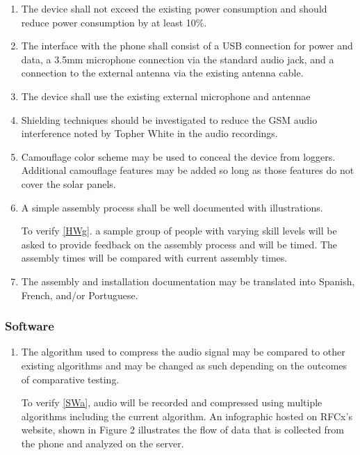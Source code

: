 \documentclass{article}
\numberwithin{figure}{section}
\numberwithin{equation}{section}
\begin{document}
{\begin{enumerate}[align=left,leftmargin=*, labelindent= 0em, label=\textbf{Requirement \thesubsubsection.\arabic*.}, itemindent=0em]
\item \label{HWa} The device shall not exceed the existing power consumption and should reduce power consumption by at least 10\%.
\item \label{HWb} The interface with the phone shall consist of a USB connection for power and data, a 3.5mm microphone connection via the standard audio jack, and a connection to the external antenna via the existing antenna cable.
\item \label{HWc}The device shall use the existing external microphone and antennae
\item \label{HWd} Shielding techniques should be investigated to reduce the GSM audio interference noted by Topher White in the audio recordings.
\item \label{HWf} Camouflage color scheme may be used to conceal the device from loggers.  Additional camouflage features may be added so long as those features do not cover the solar panels.
\item \label{HWg} A simple assembly process shall be well documented with illustrations.

\baselinestretch
To verify \ref{HWg}. a sample group of people with varying skill levels will be asked to provide feedback on the assembly process and will be timed. The assembly times will be compared with current assembly times.

\item \label{HWh} The assembly and installation documentation may be translated into Spanish, French, and/or Portuguese.
\end{enumerate}
\subsubsection{Software} \label{sect:software1}
\begin{enumerate}[align=left,leftmargin=*, labelindent= 0em, label=\textbf{Requirement \thesubsubsection.\arabic*.}, itemindent=0em]
\item \label{SWa} The algorithm used to compress the audio signal may be compared to other existing algorithms and may be changed as such depending on the outcomes of comparative testing.

\baselinestretch
To verify \ref{SWa}, audio will be recorded and compressed using multiple algorithms including the current algorithm. An infographic hosted on RFCx’s website, shown in Figure 2 illustrates the flow of data that is collected from the phone and analyzed on the server.
\end{enumerate}

}
\end{document}
